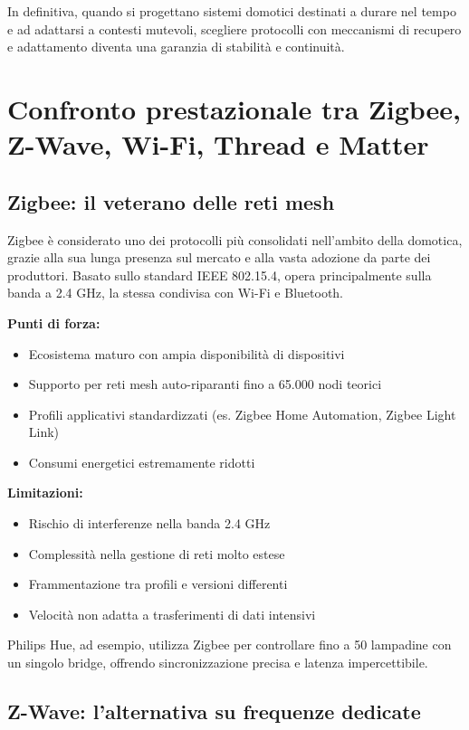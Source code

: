 In definitiva, quando si progettano sistemi domotici destinati a durare nel tempo e ad adattarsi a contesti mutevoli, scegliere protocolli con meccanismi di recupero e adattamento diventa una garanzia di stabilità e continuità.

\section{Confronto prestazionale tra Zigbee, Z-Wave, Wi-Fi, Thread e Matter}

\subsection{Zigbee: il veterano delle reti mesh}

Zigbee è considerato uno dei protocolli più consolidati nell’ambito della domotica, grazie alla sua lunga presenza sul mercato e alla vasta adozione da parte dei produttori. Basato sullo standard IEEE 802.15.4, opera principalmente sulla banda a 2.4 GHz, la stessa condivisa con Wi-Fi e Bluetooth.

\textbf{Punti di forza:}
\begin{itemize}
    \item Ecosistema maturo con ampia disponibilità di dispositivi
    \item Supporto per reti mesh auto-riparanti fino a 65.000 nodi teorici
    \item Profili applicativi standardizzati (es. Zigbee Home Automation, Zigbee Light Link)
    \item Consumi energetici estremamente ridotti
\end{itemize}

\textbf{Limitazioni:}
\begin{itemize}
    \item Rischio di interferenze nella banda 2.4 GHz
    \item Complessità nella gestione di reti molto estese
    \item Frammentazione tra profili e versioni differenti
    \item Velocità non adatta a trasferimenti di dati intensivi
\end{itemize}

Philips Hue, ad esempio, utilizza Zigbee per controllare fino a 50 lampadine con un singolo bridge, offrendo sincronizzazione precisa e latenza impercettibile.

\subsection{Z-Wave: l'alternativa su frequenze dedicate}

